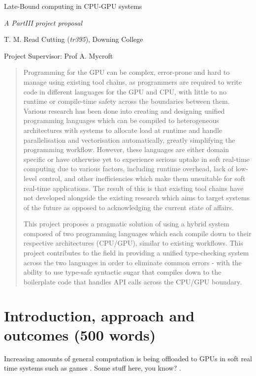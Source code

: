 \documentclass[11pt]{article}
\begin{document}
\centerline{\Large Late-Bound computing in CPU-GPU systems}
\vspace{2em}
\centerline{\Large \emph{A PartIII project proposal}}
\vspace{2em}
\centerline{\large T. M. Read Cutting (\emph{tr395}), Downing College}
\vspace{1em}
\centerline{\large Project Supervisor: Prof A. Mycroft}
\vspace{1em}

\begin{abstract}

Programming for the GPU can be complex, error-prone and hard to manage using
existing tool chains, as programmers are required to write code in different
languages for the GPU and CPU, with little to no runtime or compile-time safety
across the boundaries between them. Various research has been done into
creating and designing unified programming languages which can be compiled to
heterogeneous architectures with systems to allocate load at runtime and handle
parallelisation and vectorisation automatically, greatly simplifying the
programming workflow. However, these languages are either domain specific or
have otherwise yet to experience serious uptake in soft real-time computing due
to various factors, including runtime overhead, lack of low-level control, and
other inefficiencies which make them unsuitable for soft real-time
applications. The result of this is that existing tool chains have not
developed alongside the existing research which aims to target systems of the
future as opposed to acknowledging the current state of affairs.

This project proposes a pragmatic solution of using a hybrid system composed of
two programming languages which each compile down to their respective
architectures (CPU/GPU), similar to existing workflows. This project
contributes to the field in providing a unified type-checking system across the
two languages in order to eliminate common errors - with the ability to use
type-safe syntactic sugar that compiles down to the boilerplate code that
handles API calls across the CPU/GPU boundary.

\end{abstract}

\section{Introduction, approach and outcomes (500 words)}

Increasing amounts of general computation is being offloaded to GPUs in soft
real time systems such as games \cite{GPGPUTechniques2012}. Some stuff here,
you know? \cite{Theano2016}.
\end{document}
